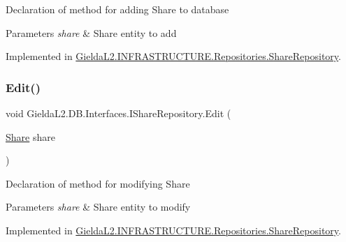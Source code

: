 Declaration of method for adding Share to database 


\begin{DoxyParams}{Parameters}
{\em share} & Share entity to add\\
\hline
\end{DoxyParams}


Implemented in \mbox{\hyperlink{class_gielda_l2_1_1_i_n_f_r_a_s_t_r_u_c_t_u_r_e_1_1_repositories_1_1_share_repository_ab72f6f527449750b41956b564c892a7c}{Gielda\+L2.\+I\+N\+F\+R\+A\+S\+T\+R\+U\+C\+T\+U\+R\+E.\+Repositories.\+Share\+Repository}}.

\mbox{\label{interface_gielda_l2_1_1_d_b_1_1_interfaces_1_1_i_share_repository_a68449340553ab4702be8f3559ea50131}} 
\subsubsection{\texorpdfstring{Edit()}{Edit()}}
{\footnotesize\ttfamily void Gielda\+L2.\+D\+B.\+Interfaces.\+I\+Share\+Repository.\+Edit (\begin{DoxyParamCaption}\item[{\mbox{\hyperlink{class_gielda_l2_1_1_d_b_1_1_entities_1_1_share}{Share}}}]{share }\end{DoxyParamCaption})}



Declaration of method for modifying Share 


\begin{DoxyParams}{Parameters}
{\em share} & Share entity to modify\\
\hline
\end{DoxyParams}


Implemented in \mbox{\hyperlink{class_gielda_l2_1_1_i_n_f_r_a_s_t_r_u_c_t_u_r_e_1_1_repositories_1_1_share_repository_ac3b39b1ed8794698ad74054688667e6a}{Gielda\+L2.\+I\+N\+F\+R\+A\+S\+T\+R\+U\+C\+T\+U\+R\+E.\+Repositories.\+Share\+Repository}}.

\mbox{\label{interface_gielda_l2_1_1_d_b_1_1_interfaces_1_1_i_share_repository_a5e13f8b06cb4711bb54137dabf783ed1}} 
